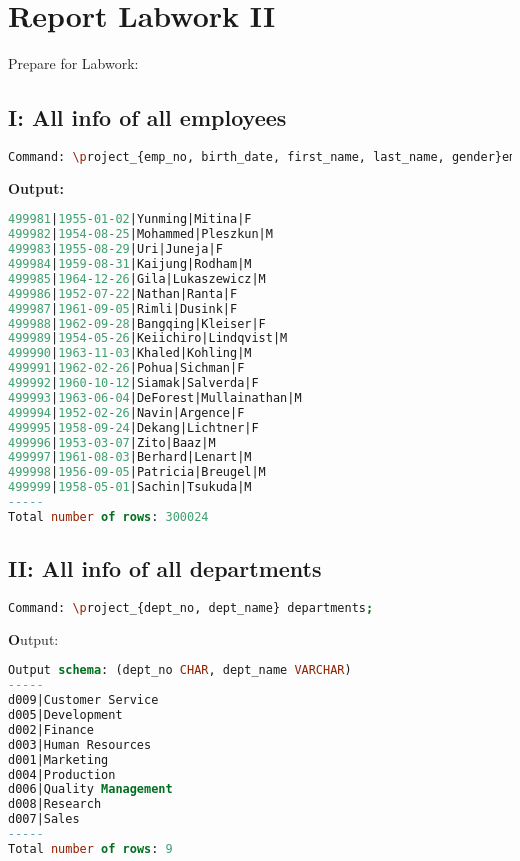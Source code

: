 \documentclass[12pt]{report}
\begin{document}
\section*{Report Labwork II}

Prepare for Labwork:

{\small
{}}
{\small
{}}
{\small
{}}
{\small
{}}
{\small
{}}


\subsection*{I: All info of all employees}

\begin{lstlisting}[language=bash]
Command: \project_{emp_no, birth_date, first_name, last_name, gender}employees;
\end{lstlisting}
\textbf{Output:}

\begin{lstlisting}[language=sql]
499981|1955-01-02|Yunming|Mitina|F
499982|1954-08-25|Mohammed|Pleszkun|M
499983|1955-08-29|Uri|Juneja|F
499984|1959-08-31|Kaijung|Rodham|M
499985|1964-12-26|Gila|Lukaszewicz|M
499986|1952-07-22|Nathan|Ranta|F
499987|1961-09-05|Rimli|Dusink|F
499988|1962-09-28|Bangqing|Kleiser|F
499989|1954-05-26|Keiichiro|Lindqvist|M
499990|1963-11-03|Khaled|Kohling|M
499991|1962-02-26|Pohua|Sichman|F
499992|1960-10-12|Siamak|Salverda|F
499993|1963-06-04|DeForest|Mullainathan|M
499994|1952-02-26|Navin|Argence|F
499995|1958-09-24|Dekang|Lichtner|F
499996|1953-03-07|Zito|Baaz|M
499997|1961-08-03|Berhard|Lenart|M
499998|1956-09-05|Patricia|Breugel|M
499999|1958-05-01|Sachin|Tsukuda|M
-----
Total number of rows: 300024	
\end{lstlisting}


\subsection*{II: All info of all departments}
\begin{lstlisting}[language=bash]
Command: \project_{dept_no, dept_name} departments;
\end{lstlisting}
\textbf Output:
\begin{lstlisting}[language=sql]
Output schema: (dept_no CHAR, dept_name VARCHAR)
-----
d009|Customer Service
d005|Development
d002|Finance
d003|Human Resources
d001|Marketing
d004|Production
d006|Quality Management
d008|Research
d007|Sales
-----
Total number of rows: 9
\end{lstlisting}
\end{document}
